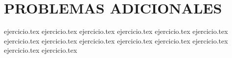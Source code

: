 \section*{PROBLEMAS ADICIONALES}
\begin{enumerate}
    \setcounter{enumi}{29}
    {ejercicio.tex}
    {ejercicio.tex}
    {ejercicio.tex}
    {ejercicio.tex}
    {ejercicio.tex}
    {ejercicio.tex}
    {ejercicio.tex}
    {ejercicio.tex}
    {ejercicio.tex}
    {ejercicio.tex}
    {ejercicio.tex}
    {ejercicio.tex}
    {ejercicio.tex}
    {ejercicio.tex}
\end{enumerate}
